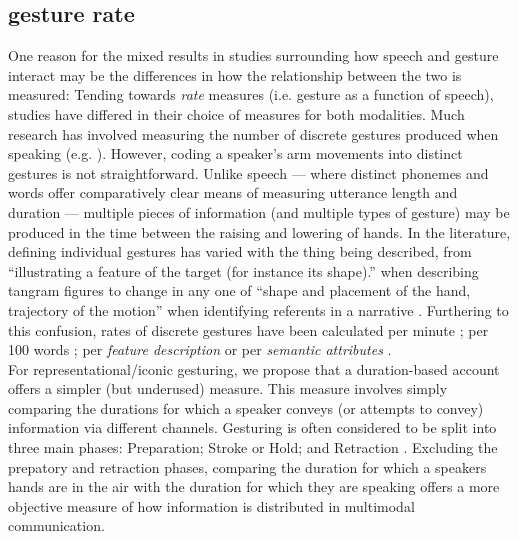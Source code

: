 \documentclass[a4paper,man,natbib]{apa6}
\newcommand*{\term}[1]{\emph{#1}} %
\begin{document}

\newpage


\subsection{gesture rate}
One reason for the mixed results in studies surrounding how speech and gesture interact may be the differences in how the relationship between the two is measured:
Tending towards \term{rate} measures (i.e. gesture as a function of speech), studies have differed in their choice of measures for both modalities.
Much research has involved measuring the number of discrete gestures produced when speaking (e.g. \citet{Hostetter2007, Gerwing2011, DeRuiter2012, Hoetjes2015}).
However, coding a speaker's arm movements into distinct gestures is not straightforward.
Unlike speech --- where distinct phonemes and words offer comparatively clear means of measuring utterance length and duration --- multiple pieces of information (and multiple types of gesture) may be produced in the time between the raising and lowering of hands.
In the literature, defining individual gestures has varied with the thing being described, from ``illustrating a feature of the target (for instance its shape).'' when describing tangram figures \citep{DeRuiter2012} to change in any one of ``shape and placement of the hand, trajectory of the motion'' when identifying referents in a narrative \citep{So2009}.
Furthering to this confusion, rates of discrete gestures have been calculated per minute \citep{Mol2011}; per 100 words \citep{Masson-Carro2015, Hostetter2007, Gerwing2011, Hoetjes2015}; per \term{feature description} \citep{DeRuiter2012} or per \term{semantic attributes} \citep{Hoetjes2015}.\\

For representational/iconic gesturing, we propose that a duration-based account offers a simpler (but underused) measure.
This measure involves simply comparing the durations for which a speaker conveys (or attempts to convey) information via different channels. 
Gesturing is often considered to be split into three main phases: Preparation; Stroke or Hold; and Retraction \citep{McNeill1992}.
Excluding the prepatory and retraction phases, comparing the duration for which a speakers hands are in the air with the duration for which they are speaking offers a more objective measure of how 
information is distributed in multimodal communication.
\end{document}
